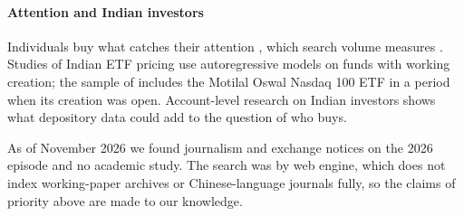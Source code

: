 \documentclass[10pt,journal,a4paper]{IEEEtran}
\theoremstyle{definition}
\begin{document}
\paragraph{Attention and Indian investors} Individuals buy what catches their attention \citep{barber2008all}, which search volume measures \citep{da2011search}. Studies of Indian ETF pricing use autoregressive models on funds with working creation; the sample of \citet{reddy2020pricing} includes the Motilal Oswal Nasdaq 100 ETF in a period when its creation was open. Account-level research on Indian investors \citep{campbell2019rich} shows what depository data could add to the question of who buys.

As of November 2026 we found journalism and exchange notices on the 2026 episode and no academic study. The search was by web engine, which does not index working-paper archives or Chinese-language journals fully, so the claims of priority above are made to our knowledge.





\end{document}
